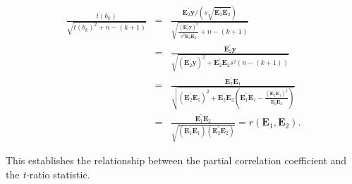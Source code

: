 \begin{center}
\begin{eqnarray*}
\frac{t(b_{k})}{\sqrt{t(b_{k})^2+n-(k+1)}} &=&\frac{\mathbf{E}
_2^{\prime} \mathbf{y} / \left(
s\sqrt{\mathbf{E}_2^{\prime}\mathbf{E}_2}\right) }
{\sqrt{\frac{\left( \mathbf{E}_2^{\prime} \mathbf{y}\right) ^2}
{s^2\mathbf{E}_2^{\prime}\mathbf{E}_2}+n-(k+1)}} \\
&=&\frac{\mathbf{E}_2^{\prime}\mathbf{y}}{\sqrt{\left(
\mathbf{E}_2^{\prime}\mathbf{y}\right) ^2+\mathbf{E}_2^{\prime}
\mathbf{E}_2 s^2\left( n-(k+1)\right) }} \\
&=&\frac{\mathbf{E}_2^{\prime}\mathbf{E}_1} {\sqrt{\left(
\mathbf{E}_2^{\prime}\mathbf{E}_1\right)^2 +
\mathbf{E}_2^{\prime}\mathbf{E}_2\left( \mathbf{E}_1^{\prime}
\mathbf{E}_1 - \frac{\left( \mathbf{E}_2^{\prime}\mathbf{E}_1\right)
^2}{\mathbf{E}_2^{\prime}\mathbf{E}_2}
\right) }} \\
&=&\frac{\mathbf{E}_1^{\prime}\mathbf{E}_2}{\sqrt{(\mathbf{E}_1^{\prime}\mathbf{E}_1)
(\mathbf{E}_2^{\prime} \mathbf{E}_2)}} =
r(\mathbf{E}_1,\mathbf{E}_2) .
\end{eqnarray*}
\end{center}
This establishes the relationship between the partial correlation
coefficient and the \textit{t-}ratio statistic.

